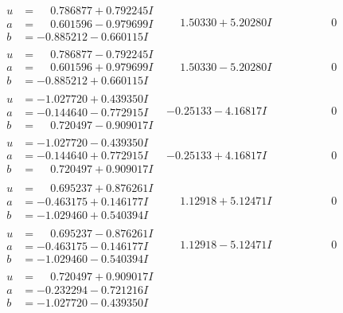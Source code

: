 \documentclass[1p]{elsarticle_modified}
\theoremstyle{definition}
\begin{document}
$$\begin{array}{c|c|c}
\begin{aligned}
u &= \phantom{-}0.786877 + 0.792245 I \\
a &= \phantom{-}0.601596 - 0.979699 I \\
b &= -0.885212 - 0.660115 I\end{aligned}
 & \phantom{-}1.50330 + 5.20280 I & \phantom{-0.000000 } 0 \\ \hline\begin{aligned}
u &= \phantom{-}0.786877 - 0.792245 I \\
a &= \phantom{-}0.601596 + 0.979699 I \\
b &= -0.885212 + 0.660115 I\end{aligned}
 & \phantom{-}1.50330 - 5.20280 I & \phantom{-0.000000 } 0 \\ \hline\begin{aligned}
u &= -1.027720 + 0.439350 I \\
a &= -0.144640 - 0.772915 I \\
b &= \phantom{-}0.720497 - 0.909017 I\end{aligned}
 & -0.25133 - 4.16817 I & \phantom{-0.000000 } 0 \\ \hline\begin{aligned}
u &= -1.027720 - 0.439350 I \\
a &= -0.144640 + 0.772915 I \\
b &= \phantom{-}0.720497 + 0.909017 I\end{aligned}
 & -0.25133 + 4.16817 I & \phantom{-0.000000 } 0 \\ \hline\begin{aligned}
u &= \phantom{-}0.695237 + 0.876261 I \\
a &= -0.463175 + 0.146177 I \\
b &= -1.029460 + 0.540394 I\end{aligned}
 & \phantom{-}1.12918 + 5.12471 I & \phantom{-0.000000 } 0 \\ \hline\begin{aligned}
u &= \phantom{-}0.695237 - 0.876261 I \\
a &= -0.463175 - 0.146177 I \\
b &= -1.029460 - 0.540394 I\end{aligned}
 & \phantom{-}1.12918 - 5.12471 I & \phantom{-0.000000 } 0 \\ \hline\begin{aligned}
u &= \phantom{-}0.720497 + 0.909017 I \\
a &= -0.232294 - 0.721216 I \\
b &= -1.027720 - 0.439350 I\end{aligned}

\end{array}$$
\end{document}
